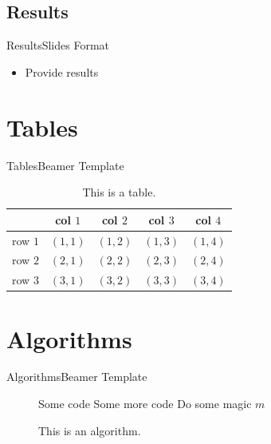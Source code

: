 \documentclass[hyperref={pdfpagemode=UseOutlines}]{beamer}
\numberwithin{equation}{mycounter} %
\numberwithin{table}{mycounter}
\begin{document}
\subsection{Results}
\begin{frame}{Results}{Slides Format}
    \begin{itemize}
        \item Provide results
    \end{itemize}
\end{frame}

\section{Tables}
\begin{frame}{Tables}{Beamer Template}
    \begin{table}[H]
        \centering
        \caption{This is a table.}
        \begin{tabular}{lcccc}
            \toprule
             & col $1$ & col $2$ & col $3$ & col  $4$ \\
            \midrule
            row $1$ & $(1,1)$ & $(1,2)$ & $(1,3)$ & $(1,4)$ \\
            row $2$ & $(2,1)$ & $(2,2)$ & $(2,3)$ & $(2,4)$ \\
            row $3$ & $(3,1)$ & $(3,2)$ & $(3,3)$ & $(3,4)$ \\
            \bottomrule
        \end{tabular}
        \label{table1}
    \end{table}
\end{frame}

\section{Algorithms}
\begin{frame}{Algorithms}{Beamer Template}
    \begin{figure}
        \centering
        \begin{minipage}{0.8\linewidth}
            \begin{algorithm}[H]
                \caption{This is an algorithm.}
                \label{algo1}

                {
                    Some code\;
                    Some more code\; \label{line1}
                }
                {
                    {
                        Do some magic\;
                    }
                    \Else
                    {
                        \Return $m$\;
                    }
                }
            \end{algorithm}
        \end{minipage}
    \end{figure}
\end{frame}
\end{document}
